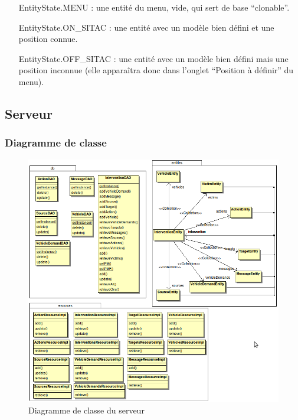 \documentclass{article}
\begin{document}
\begin{itemize}

\item[EntityState.MENU : ] une entité du menu, vide, qui sert de base ``clonable''.

\item[EntityState.ON\_SITAC : ] une entité avec un modèle bien défini et une position connue.

\item[EntityState.OFF\_SITAC : ] une entité avec un modèle bien défini mais une position inconnue (elle apparaîtra donc dans l'onglet ``Position à définir'' du menu).

\end{itemize}

\newpage
\subsection{Serveur}

\subsubsection{Diagramme de classe}

\begin{figure}[htbp]
\begin{center}
\includegraphics[width=460pt]{doc_dev-fig011.png}
\caption{Diagramme de classe du serveur}
\end{center}
\end{figure}
\end{document}
